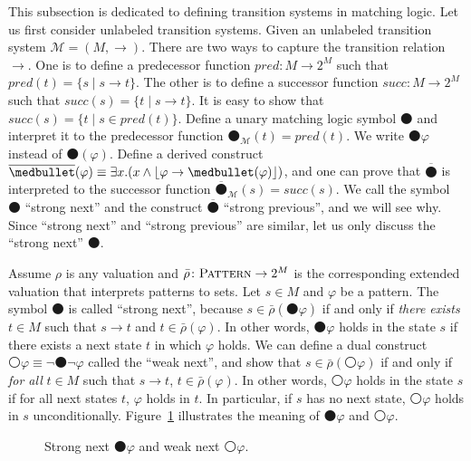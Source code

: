 \documentclass[letter,12pt]{article}
\newcommand{\imp}{\to}
\newcommand{\Pattern}{\textnormal{\textsc{Pattern}}}
\newcommand{\MM}{\mathcal{M}}
\newcommand{\pset}[1]{2^{#1}}
\newcommand{\barrho}{\bar{\rho}}
\newcommand{\widebar}[1]{\overline{#1}}
\DeclarePairedDelimiter{\floor}{\lfloor}{\rfloor}
\newcommand{\wnext}{{\medcirc}}
\newcommand{\snext}{{\medbullet}}
\newcommand{\sprev}{{\widebar{\snext}}}
\newcommand{\pred}{\mathit{pred}}
\newcommand{\succc}{\mathit{succ}}
\begin{document}
This subsection is dedicated to defining transition systems in matching logic.
Let us first consider unlabeled transition systems.
Given an unlabeled transition system $\MM = (M,\to)$.
There are two ways to capture the transition relation $\to$.
One is to define a predecessor function $\pred \colon M \to \pset{M}$
such that $\pred(t) = \{s \mid s \to t\}$.
The other is to define a successor function $\succc \colon M\to \pset{M}$
such that $\succc(s) = \{ t \mid s \to t \}$.
It is easy to show that $\succc(s) = \{ t \mid s \in \pred(t) \}$.
Define a unary matching logic symbol $\snext$
and interpret it to the predecessor function $\snext_\MM(t) = \pred(t)$.
We write $\snext \varphi$ instead of $\snext(\varphi)$.
Define a derived construct
$\sprev(\varphi) \equiv \exists x . (x \wedge \floor{\varphi \imp \snext(\varphi)})$,
and one can prove that $\sprev$ is interpreted to the successor function
$\sprev_\MM(s) = \succc(s)$.
We call the symbol $\snext$ ``strong next'' and the construct $\sprev$ ``strong previous'',
and we will see why.
Since ``strong next'' and ``strong previous'' are similar, let us only discuss
the ``strong next'' $\snext$.

Assume $\rho$ is any valuation
and $\barrho \colon \Pattern \to \pset{M}$ is the corresponding extended valuation
that interprets patterns to sets.
Let $s \in M$ and $\varphi$ be a pattern.
The symbol $\snext$ is called ``strong next'', because
$s \in \barrho(\snext \varphi)$ if and only if  \emph{there exists} $t \in M$ such that
$s \to t$ and $t \in \barrho(\varphi)$.
In other words, $\snext \varphi$ holds in the state $s$ if
there exists a next state $t$ in which $\varphi$ holds.
We can define a dual construct $\wnext \varphi \equiv \neg \snext \neg \varphi$
called the ``weak next'', and show that
$s \in \barrho(\wnext \varphi)$ if and only if
\emph{for all} $t \in M$ such that $s \to t$, $t \in \barrho(\varphi)$.
In other words, $\wnext \varphi$ holds in the state $s$ if
for all next states $t$, $\varphi$ holds in $t$.
In particular, if $s$ has no next state, $\wnext \varphi$ holds in $s$ unconditionally.
Figure~\ref{fig_snext_wnext} illustrates the meaning of $\snext \varphi$ and $\wnext \varphi$.
\begin{figure}
\caption{Strong next $\snext \varphi$ and weak next $\wnext \varphi$.}
\label{fig_snext_wnext}
\end{figure}
\end{document}
